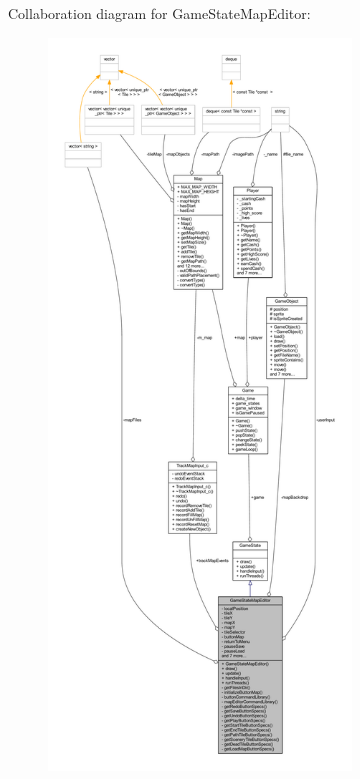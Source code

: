 Collaboration diagram for Game\+State\+Map\+Editor\+:\nopagebreak
\begin{figure}[H]
\begin{center}
\leavevmode
\includegraphics[height=550pt]{class_game_state_map_editor__coll__graph}
\end{center}
\end{figure}
